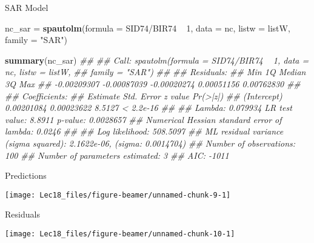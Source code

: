 \documentclass[11pt,ignorenonframetext,]{beamer}
\newenvironment{Shaded}{}{}
\newcommand{\CommentTok}[1]{\textcolor[rgb]{0.38,0.63,0.69}{\textit{#1}}}
\newcommand{\DataTypeTok}[1]{\textcolor[rgb]{0.56,0.13,0.00}{#1}}
\newcommand{\DecValTok}[1]{\textcolor[rgb]{0.25,0.63,0.44}{#1}}
\newcommand{\KeywordTok}[1]{\textcolor[rgb]{0.00,0.44,0.13}{\textbf{#1}}}
\newcommand{\NormalTok}[1]{#1}
\newcommand{\OperatorTok}[1]{\textcolor[rgb]{0.40,0.40,0.40}{#1}}
\newcommand{\StringTok}[1]{\textcolor[rgb]{0.25,0.44,0.63}{#1}}
\let\oldShaded\Shaded
\let\endoldShaded\endShaded
\renewenvironment{Shaded}{\footnotesize\begin{spacing}{0.9}\oldShaded}{\endoldShaded\end{spacing}}
\let\oldverbatim\verbatim
\let\endoldverbatim\endverbatim
\newcommand{\scriptoutput}{
  \renewenvironment{Shaded}{\scriptsize\begin{spacing}{0.9}\oldShaded}{\endoldShaded\end{spacing}}
  \renewenvironment{verbatim}{\scriptsize\begin{spacing}{0.9}\oldverbatim}{\endoldverbatim\end{spacing}}
}
\begin{document}
\begin{frame}[fragile,t]{SAR Model}
\protect\hypertarget{sar-model}{}

\scriptoutput

\begin{Shaded}
\begin{Highlighting}[]
\NormalTok{nc_sar =}\StringTok{ }\KeywordTok{spautolm}\NormalTok{(}\DataTypeTok{formula =}\NormalTok{ SID74}\OperatorTok{/}\NormalTok{BIR74 }\OperatorTok{~}\StringTok{ }\DecValTok{1}\NormalTok{, }\DataTypeTok{data =}\NormalTok{ nc, }
                  \DataTypeTok{listw =}\NormalTok{ listW, }\DataTypeTok{family =} \StringTok{"SAR"}\NormalTok{)}

\KeywordTok{summary}\NormalTok{(nc_sar)}
\CommentTok{## }
\CommentTok{## Call: spautolm(formula = SID74/BIR74 ~ 1, data = nc, listw = listW, }
\CommentTok{##     family = "SAR")}
\CommentTok{## }
\CommentTok{## Residuals:}
\CommentTok{##         Min          1Q      Median          3Q         Max }
\CommentTok{## -0.00209307 -0.00087039 -0.00020274  0.00051156  0.00762830 }
\CommentTok{## }
\CommentTok{## Coefficients: }
\CommentTok{##               Estimate Std. Error z value  Pr(>|z|)}
\CommentTok{## (Intercept) 0.00201084 0.00023622  8.5127 < 2.2e-16}
\CommentTok{## }
\CommentTok{## Lambda: 0.079934 LR test value: 8.8911 p-value: 0.0028657 }
\CommentTok{## Numerical Hessian standard error of lambda: 0.0246 }
\CommentTok{## }
\CommentTok{## Log likelihood: 508.5097 }
\CommentTok{## ML residual variance (sigma squared): 2.1622e-06, (sigma: 0.0014704)}
\CommentTok{## Number of observations: 100 }
\CommentTok{## Number of parameters estimated: 3 }
\CommentTok{## AIC: -1011}
\end{Highlighting}
\end{Shaded}

\end{frame}

\begin{frame}{Predictions}
\protect\hypertarget{predictions}{}

\begin{center}\texttt{[image: Lec18\_files/figure-beamer/unnamed-chunk-9-1]} \end{center}

\end{frame}

\begin{frame}{Residuals}
\protect\hypertarget{residuals}{}

\begin{center}\texttt{[image: Lec18\_files/figure-beamer/unnamed-chunk-10-1]} \end{center}

\end{frame}
\end{document}
